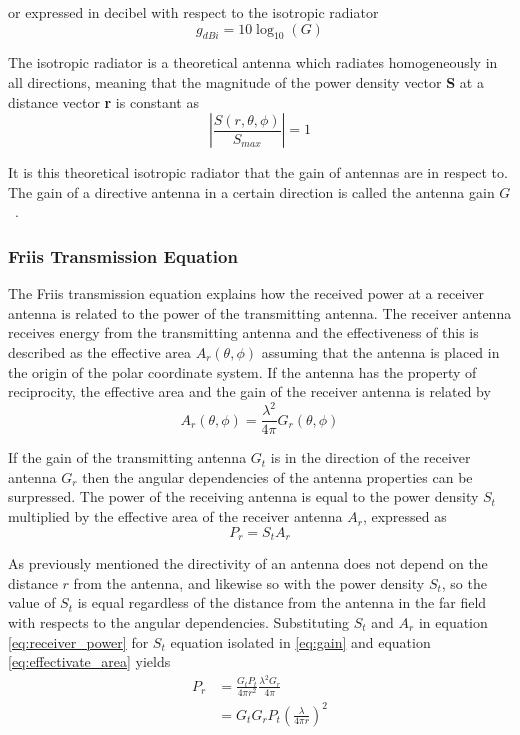 or expressed in decibel with respect to the isotropic radiator
\begin{equation} \label{eq:gain_dbi}
    g_{dBi} = 10 \log_{10}\left(G\right)
\end{equation}

The isotropic radiator is a theoretical antenna which radiates homogeneously in all directions, meaning that the magnitude of the power density vector \textbf{S} at a distance vector \textbf{r} is constant as
\begin{equation} \label{eq:isotropic_radiation}
    \left| \frac{S \left(r, \theta, \phi \right)}{S_{max}} \right|=1
\end{equation}

It is this theoretical isotropic radiator that the gain of antennas are in respect to. The gain of a directive antenna in a certain direction is called the antenna gain $G$~\cite[pp. 10-12]{ant_beam_form}.

\subsubsection{Friis Transmission Equation}
The Friis transmission equation explains how the received power at a receiver antenna is related to the power of the transmitting antenna. The receiver antenna receives energy from the transmitting antenna and the effectiveness of this is described as the effective area $A_r\left( \theta, \phi \right)$ assuming that the antenna is placed in the origin of the polar coordinate system. If the antenna has the property of reciprocity, the effective area and the gain of the receiver antenna is related by 
\begin{equation} \label{eq:effectivate_area}
    A_r \left( \theta, \phi \right) = \frac{\lambda^2}{4 \pi} G_r \left( \theta, \phi \right)
\end{equation}

If the gain of the transmitting antenna $G_t$ is in the direction of the receiver antenna $G_r$ then the angular dependencies of the antenna properties can be surpressed. The power of the receiving antenna is equal to the power density $S_t$ multiplied by the effective area of the receiver antenna $A_r$, expressed as
\begin{equation} \label{eq:receiver_power}
    P_r = S_t A_r
\end{equation} 

As previously mentioned the directivity of an antenna does not depend on the distance $r$ from the antenna, and likewise so with the power density $S_t$, so the value of $S_t$ is equal regardless of the distance from the antenna in the far field with respects to the angular dependencies. Substituting $S_t$ and $A_r$ in equation \ref{eq:receiver_power} for $S_t$ equation isolated in \ref{eq:gain} and equation \ref{eq:effectivate_area} yields
\begin{equation} \label{eq:friis}
    \begin{split}
        P_r & = \frac{G_t P_t}{4 \pi r^2} \frac{\lambda^2 G_r}{4 \pi} \\
        & = G_t  G_r P_t \left( \frac{\lambda}{4 \pi r} \right)^2
    \end{split}
\end{equation} 

